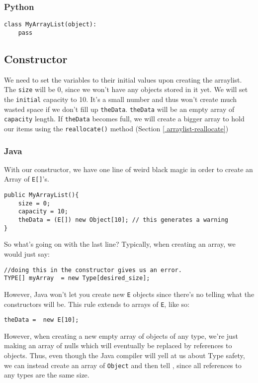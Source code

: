 \subsubsection{Python}
\begin{verbatim}
class MyArrayList(object):
	pass
\end{verbatim}


\subsection{Constructor}

We need to set the variables to their initial values upon creating the arraylist.
The \texttt{size} will be 0, since we won't have any objects stored in it yet.
We will set the \texttt{initial} capacity to 10.  
It's a small number and thus won't create much wasted space if we don't fill up \texttt{theData}.
\texttt{theData} will be an empty array of \texttt{capacity} length.
If \texttt{theData} becomes full, we will create a bigger array to hold our items using the \texttt{reallocate()} method (Section \ref{
arraylist-reallocate})  %


\subsubsection{Java}
With our constructor, we have one line of weird black magic in order to create an Array of \texttt{E[]}'s.
\begin{verbatim}
public MyArrayList(){
	size = 0;
	capacity = 10;
	theData = (E[]) new Object[10]; // this generates a warning
}
\end{verbatim}

So what's going on with the last line?
Typically, when creating an array, we would just say:

\begin{verbatim}
//doing this in the constructor gives us an error.
TYPE[] myArray  = new Type[desired_size];
\end{verbatim}

However, Java won't let you create new \texttt{E} objects since there's no telling what the constructors will be.  This rule extends to arrays of \texttt{E}, like so:
\begin{verbatim}
theData =  new E[10];
\end{verbatim}

However, when creating a new empty array of objects of any type, we're just making an array of nulls which will eventually be replaced by references to objects.  Thus, even though the Java compiler will yell at us about Type safety, we can instead create an array of \texttt{Object} and then tell , since all references to any types are the same size.

